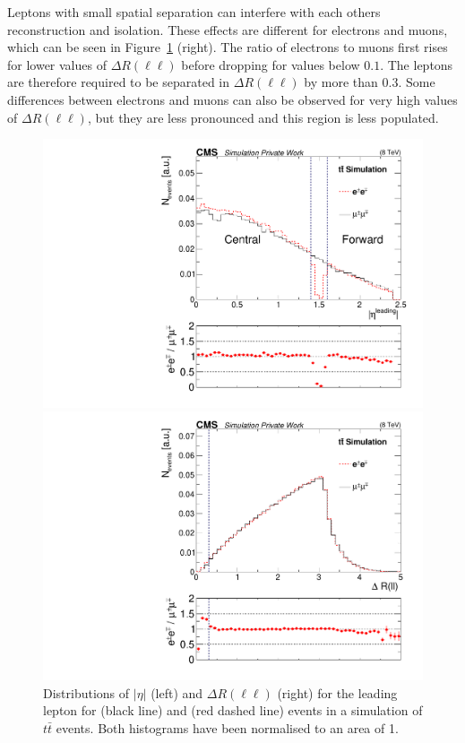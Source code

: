 Leptons with small spatial separation can interfere with each others reconstruction and isolation. These effects are different for electrons and muons, which can be seen in Figure~\ref{fig:cutJustification} (right). The ratio of electrons to muons first rises for lower values of $\Delta R(\ell\ell)$ before dropping for values below $0.1$. The leptons are therefore required to be separated in $\Delta R(\ell\ell)$ by more than 0.3. Some differences between electrons and muons can also be observed for very high values of $\Delta R(\ell\ell)$, but they are less pronounced and this region is less populated.  

\begin{figure}[htbp]
\centering
\begin{minipage}[t]{0.49\textwidth}
  \includegraphics[width=\textwidth]{plots/SELECTION/gapJustification.pdf}
\end{minipage}
\begin{minipage}[t]{0.49\textwidth}
\includegraphics[width=\textwidth]{plots/SELECTION/dRJustification_eeVSmm.pdf}
\end{minipage}
\caption{Distributions of $|\eta|$ (left) and $\Delta R(\ell\ell)$ (right) for the leading lepton for \MM (black line) and \EE (red dashed line) events in a simulation of $t\bar{t}$ events. Both histograms have been normalised to an area of 1.}
\label{fig:cutJustification}
\end{figure}    

